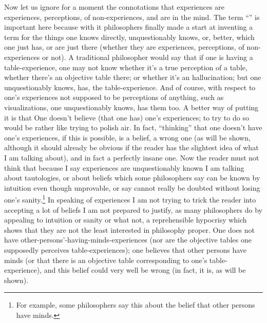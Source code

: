 Now let us ignore for a moment the connotations that experiences are experiences, perceptions, of non-experiences, and are in the mind. The term \enquote{} is important here because with it philosophers finally made a start at inventing a term for the things one knows directly, unquestionably knows, or, better, which one just has, or are just there (whether they are experiences, perceptions, of non-experiences or not). A traditional philosopher would say that if one is having a table-experience, one may not know whether it's a true perception of a table, whether there's an objective table there; or whether it's an hallucination; but one unquestionably knows, has, the table-experience. And of course, with respect to one's experiences not supposed to be perceptions of anything, such as visualizations, one unquestionably knows, has them too. A better way of putting it is that One doesn't believe (that one has) one's experiences; to try to do so would be rather like trying to polish air. In fact, \enquote{thinking} that one doesn't have one's experiences, if this is possible, is a belief, a wrong one (as will be shown, although it should already be obvious if the reader has the slightest idea of what I am talking about), and in fact a perfectly insane one. Now the reader must not think that because I say experiences are unquestionably known I am talking about tautologies, or about beliefs which some philosophers say can be known by intuition even though unprovable, or say cannot really be doubted without losing one's sanity.\footnote{For example, some philosophers say this about the belief that other persons have minds.} In speaking of experiences I am not trying to trick the reader into accepting a lot of beliefs I am not prepared to justify, as many philosophers do by appealing to intuition or sanity or what not, a reprehensible hypocrisy which shows that they are not the least interested in philosophy proper. One does not have other-persons'-having-minds-experiences (nor are the objective tables one supposedly perceives table-experiences); one believes that other persons have minds (or that there is an objective table corresponding to one's table-experience), and this belief could very well be wrong (in fact, it is, as will be shown). 

